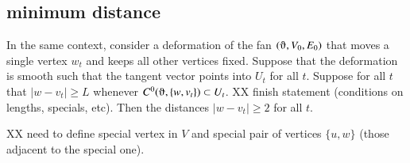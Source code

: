 \subsection{minimum distance}

\begin{lemma}\label{dist2} In the same context, consider a deformation
of the fan $(\orgn,V_0,E_0)$ that moves a single vertex $w_t$
and keeps all other vertices fixed.  Suppose that the deformation is
smooth such that the tangent vector points into $U_t$ for all $t$.
Suppose for all $t$ that $|w-v_t| \ge L$ whenever
$C^0(\orgn,\{w,v_t\})\subset U_t$.
XX finish statement (conditions on lengths, specials, etc).   
Then the distances $|w-v_t|\ge 2$ for all
$t$.
\end{lemma}

XX need to define special vertex in $V$ and special pair
of vertices $\{u,w\}$ (those adjacent to the special one).


